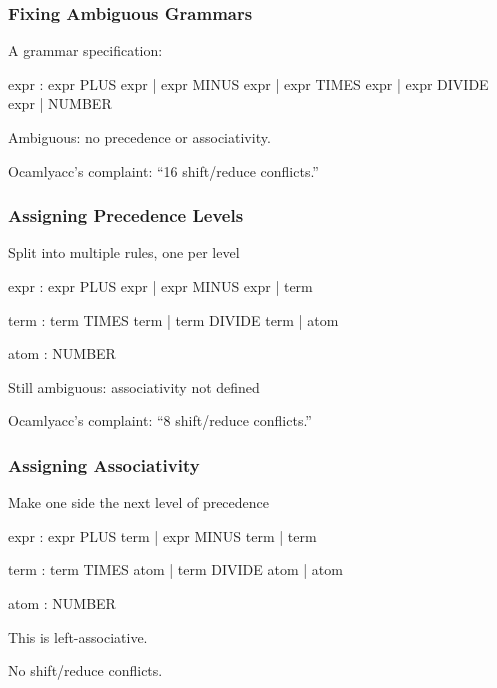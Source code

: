 \documentclass{plt}
\begin{document}
\begin{frame}[fragile]
  \frametitle{Fixing Ambiguous Grammars}

A grammar specification:

\begin{ocamlyacc}
expr :
    expr PLUS expr  
  | expr MINUS expr 
  | expr TIMES expr 
  | expr DIVIDE expr
  | NUMBER          
\end{ocamlyacc}

Ambiguous: no precedence or associativity.

Ocamlyacc's complaint: ``16 shift/reduce conflicts.''

\end{frame}

\begin{frame}[fragile]
  \frametitle{Assigning Precedence Levels}

Split into multiple rules, one per level

\begin{ocamlyacc}
expr : expr PLUS expr  
     | expr MINUS expr 
     | term            

term : term TIMES term 
     | term DIVIDE term
     | atom            

atom  : NUMBER         
\end{ocamlyacc}

Still ambiguous: associativity not defined

Ocamlyacc's complaint: ``8 shift/reduce conflicts.''

\end{frame}

\begin{frame}[fragile]
  \frametitle{Assigning Associativity}

Make one side the next level of precedence

\begin{ocamlyacc}
expr : expr PLUS term  
     | expr MINUS term 
     | term            

term : term TIMES atom 
     | term DIVIDE atom
     | atom            

atom  : NUMBER         
\end{ocamlyacc}

This is left-associative.

No shift/reduce conflicts.

\end{frame}

\renewcommand{\id}{\textbf{Id}}
\end{document}
